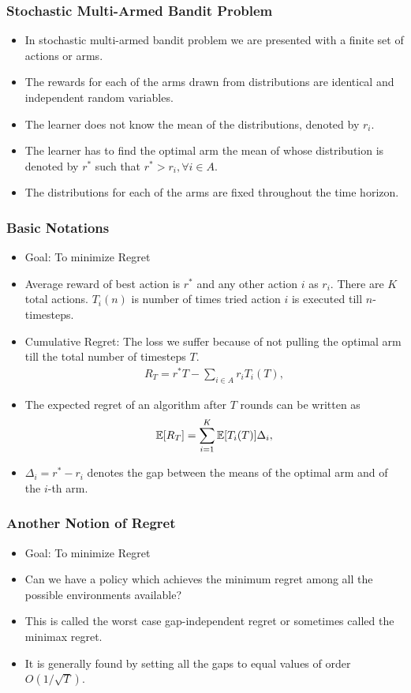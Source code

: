 \begin{frame}
\frametitle{Stochastic Multi-Armed Bandit Problem}
\begin{itemize}
\item<1-> In stochastic multi-armed bandit problem we are presented with a finite set of actions or arms. 
\item<2-> The rewards for each of the arms drawn from distributions are identical and independent random variables. 
\item<3-> The learner does not know the mean of the distributions, denoted by $r_{i}$. 
\item<4-> The learner has to find the optimal arm the mean of whose distribution is denoted by $r^{*}$ such that $r^{*}> r_{i}, \forall i\in A$.
\item<5-> The distributions for each of the arms are fixed throughout the time horizon. 
\end{itemize}
\end{frame}

\begin{frame}
\frametitle{Basic Notations}
\begin{itemize}
\item<1-> Goal: To minimize Regret
\item<2-> Average reward of best action is $r^{*}$ and any other action $i$ as $r_{i}$. There are $K$ total actions. $T_{i}(n)$ is number of times tried action $i$ is executed till $n$-timesteps.
\item<3-> Cumulative Regret: The loss we suffer because of not pulling the optimal arm till the total number of timesteps  $T$. 
\begin{align*}
R_{T}=r^{*}T - \sum_{i\in A} r_{i}T_{i}(T),
\end{align*}
\item<4-> The expected regret of an algorithm after $T$ rounds can be written as
\begin{align*}
\mathbb{E}[R_{T}]= \sum_{i=1}^K \mathbb{E}[T_{i}(T)] \Delta_i,
\end{align*}
\item<4-> $\Delta_{i}=r^{*}-r_{i}$ denotes the gap between the means of the optimal arm and of the $i$-th arm. 
\end{itemize}
\end{frame}

\begin{frame}
\frametitle{Another Notion of Regret}
\begin{itemize}
\item<1-> Goal: To minimize Regret
\item<2-> Can we have a policy which achieves the minimum regret among all the possible environments available?
\item<3-> This is called the worst case gap-independent regret or sometimes called the minimax regret.
\item<4-> It is generally found by setting all the gaps to equal values of order $O\left( 1/\sqrt{T} \right)$.
\end{itemize}
\end{frame}